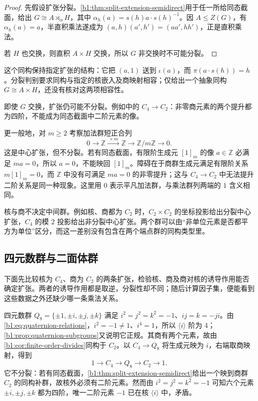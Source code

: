 \begin{proof}
	先假设扩张分裂。\cref{b1:thm:split-extension-semidirect}用于任一所给同态截面，给出 \(G\cong A\rtimes_\alpha H\)，其中 \(\alpha_h(a)=s(h)a\cdot s(h)^{-1}\)。因 \(A\leq Z(G)\)，有 \(\alpha_h(a)=a\)，半直积乘法遂成为 \((a,h)(a',h')=(aa',hh')\)，正是直积乘法。

	若 \(H\) 也交换，则直积 \(A\times H\) 交换，所以 \(G\) 非交换时不可能分裂。
\end{proof}

这个同构保持指定扩张的结构：它把 \((a,1)\) 送到 \(\iota(a)\)，而 \(\pi(a\cdot s(h))=h\)。分裂判别要求同构与指定的核嵌入及商映射相容；仅给出一个抽象同构 \(G\cong A\times H\)，还没有核对这两项相容性。

\ProseParagraphBreak
即使 \(G\) 交换，扩张仍可能不分裂。例如中的 \(C_4\rightarrow C_2\)：非零商元素的两个提升都为四阶，不能成为同态截面中二阶元素的像。

\ProseParagraphBreak
更一般地，对 \(m\geq2\) 考察加法群短正合列
\[
	0\longrightarrow\mathbb Z\xrightarrow{\ \times m\ }\mathbb Z \longrightarrow\mathbb Z/m\mathbb Z\longrightarrow0.
\]
这是中心扩张，但不分裂。若有同态截面，有限阶生成元 \([1]_m\) 的像 \(a\in\mathbb Z\) 必满足 \(ma=0\)，所以 \(a=0\)，不能映回 \([1]_m\)。障碍在于商群生成元满足有限阶关系 \(m[1]_m=0\)，而 \(\mathbb Z\) 中没有可满足 \(ma=0\) 的非零提升；这与 \(C_4\rightarrow C_2\) 中无法提升二阶关系是同一种现象。这里用 \(0\) 表示平凡加法群，与乘法群列两端的 \(1\) 含义相同。

\ProseParagraphBreak
核与商不决定中间群。例如核、商都为 \(C_2\) 时，\(C_2\times C_2\) 的坐标投影给出分裂中心扩张，\(C_4\) 的模 \(2\) 投影给出非分裂中心扩张。两个群可以由“非单位元素是否都平方为单位”区分，而这一差别没有包含在两个端点群的同构类型里。

\subsection{四元数群与二面体群}
\label{b1:subsec:0604:02}

下面先比较核为 \(C_4\)、商为 \(C_2\) 的两条扩张，检验核、商及商对核的诱导作用能否确定扩张。两者的诱导作用都是取逆，分裂性却不同；随后计算因子集，便能看到这些数据之外还缺少哪一条乘法关系。

\ProseParagraphBreak
四元数群 \(Q_8=\{\pm1,\pm i,\pm j,\pm k\}\) 满足 \(i^2=j^2=k^2=-1\)、\(ij=k=-ji\)。由\eqref{b1:eq:quaternion-relations}，\(i^2=-1\neq1\)、\(i^4=1\)，所以 \(\langle i\rangle\) 阶为 \(4\)；\cref{b1:prop:quaternion-subgroups}又说明它正规。其商有两个元素，故由\cref{b1:cor:finite-order-divides}同构于 \(C_2\)。以 \(C_4\rightarrow Q_8\) 将生成元映为 \(i\)，右端取商映射，得到
\[
	1\longrightarrow C_4\longrightarrow Q_8\longrightarrow C_2\longrightarrow1.
\]
它不分裂：若有同态截面，\cref{b1:thm:split-extension-semidirect}给出一个映到商群 \(C_2\) 的同构补群，故核外必须有二阶元素。然而由 \(i^2=j^2=k^2=-1\) 可知六个元素 \(\pm i,\pm j,\pm k\) 都为四阶，唯一二阶元素 \(-1\) 已在核 \(\langle i\rangle\) 中，矛盾。

